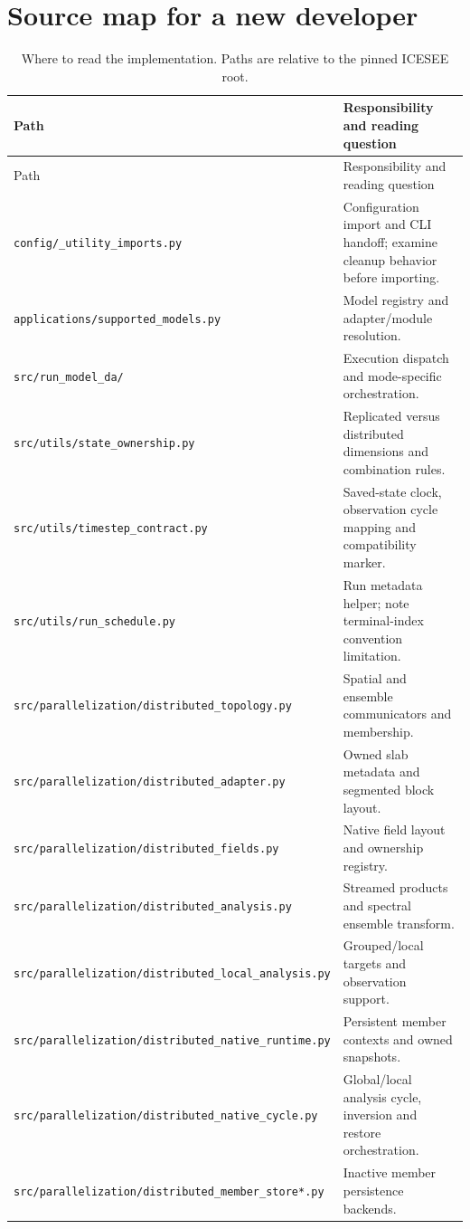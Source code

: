 \documentclass[11pt,a4paper]{article}
\newcommand{\code}[1]{\nolinkurl{#1}}
\begin{document}
\section{Source map for a new developer}
\small
\begin{longtable}{p{.49\linewidth}p{.44\linewidth}}
\caption{Where to read the implementation. Paths are relative to the pinned ICESEE root.}\\\toprule
Path & Responsibility and reading question\\\midrule\endfirsthead
\toprule Path & Responsibility and reading question\\\midrule\endhead
\code{config/_utility_imports.py} & Configuration import and CLI handoff; examine cleanup behavior before importing.\\
\code{applications/supported_models.py} & Model registry and adapter/module resolution.\\
\code{src/run_model_da/} & Execution dispatch and mode-specific orchestration.\\
\code{src/utils/state_ownership.py} & Replicated versus distributed dimensions and combination rules.\\
\code{src/utils/timestep_contract.py} & Saved-state clock, observation cycle mapping and compatibility marker.\\
\code{src/utils/run_schedule.py} & Run metadata helper; note terminal-index convention limitation.\\
\code{src/parallelization/distributed_topology.py} & Spatial and ensemble communicators and membership.\\
\code{src/parallelization/distributed_adapter.py} & Owned slab metadata and segmented block layout.\\
\code{src/parallelization/distributed_fields.py} & Native field layout and ownership registry.\\
\code{src/parallelization/distributed_analysis.py} & Streamed products and spectral ensemble transform.\\
\code{src/parallelization/distributed_local_analysis.py} & Grouped/local targets and observation support.\\
\code{src/parallelization/distributed_native_runtime.py} & Persistent member contexts and owned snapshots.\\
\code{src/parallelization/distributed_native_cycle.py} & Global/local analysis cycle, inversion and restore orchestration.\\
\code{src/parallelization/distributed_member_store*.py} & Inactive member persistence backends.\\

\end{longtable}
\end{document}
